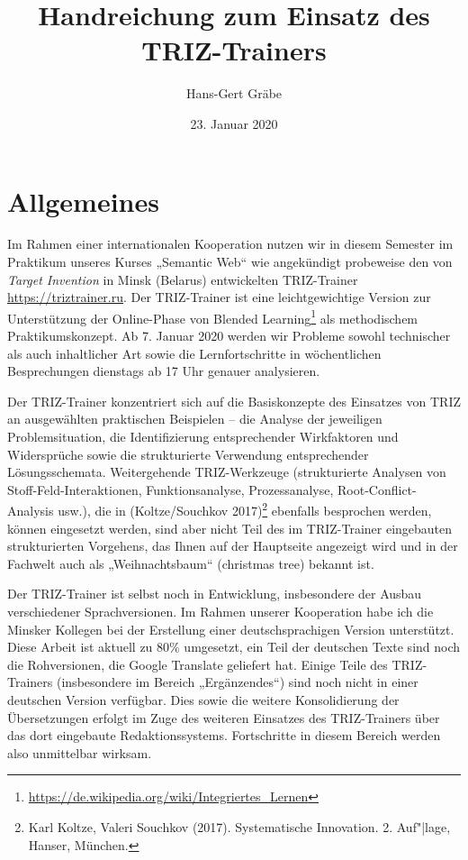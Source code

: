 \documentclass[11pt,a4paper]{article}
\title{Handreichung zum Einsatz des TRIZ-Trainers}
\author{Hans-Gert Gr\"abe}
\date{23. Januar 2020}
\begin{document}
\maketitle

\section{Allgemeines}

Im Rahmen einer internationalen Kooperation nutzen wir in diesem Semester im
Praktikum unseres Kurses „Semantic Web“ wie angekündigt probeweise den von
\emph{Target Invention} in Minsk (Belarus) entwickelten TRIZ-Trainer
\url{https://triztrainer.ru}.  Der TRIZ-Trainer ist eine leichtgewichtige
Version zur Unterstützung der Online-Phase von Blended
Learning\footnote{\url{https://de.wikipedia.org/wiki/Integriertes_Lernen}} als
methodischem Praktikumskonzept.  Ab 7. Januar 2020 werden wir Probleme sowohl
technischer als auch inhaltlicher Art sowie die Lernfortschritte in
wöchentlichen Besprechungen dienstags ab 17 Uhr genauer analysieren.

Der TRIZ-Trainer konzentriert sich auf die Basiskonzepte des Einsatzes von
TRIZ an ausgewählten praktischen Beispielen -- die Analyse der jeweiligen
Problemsituation, die Identifizierung entsprechender Wirkfaktoren und
Widersprüche sowie die strukturierte Verwendung entsprechender
Lösungsschemata.  Weitergehende TRIZ-Werkzeuge (strukturierte Analysen von
Stoff-Feld-Interaktionen, Funktionsanalyse, Prozessanalyse,
Root-Conflict-Analysis usw.), die in (Koltze/Souchkov 2017)\footnote{Karl
  Koltze, Valeri Souchkov (2017). Systematische Innovation.  2. Auf"|lage,
  Hanser, München.} ebenfalls besprochen werden, können eingesetzt werden,
sind aber nicht Teil des im TRIZ-Trainer eingebauten strukturierten Vorgehens,
das Ihnen auf der Hauptseite angezeigt wird und in der Fachwelt auch als
„Weihnachtsbaum“ (christmas tree) bekannt ist.

Der TRIZ-Trainer ist selbst noch in Entwicklung, insbesondere der Ausbau
verschiedener Sprachversionen.  Im Rahmen unserer Kooperation habe ich die
Minsker Kollegen bei der Erstellung einer deutschsprachigen Version
unterstützt.  Diese Arbeit ist aktuell zu 80\% umgesetzt, ein Teil der
deutschen Texte sind noch die Rohversionen, die Google Translate geliefert
hat.  Einige Teile des TRIZ-Trainers (insbesondere im Bereich „Ergänzendes“)
sind noch nicht in einer deutschen Version verfügbar. Dies sowie die weitere
Konsolidierung der Übersetzungen erfolgt im Zuge des weiteren Einsatzes des
TRIZ-Trainers über das dort eingebaute Redaktionssystems. Fortschritte in
diesem Bereich werden also unmittelbar wirksam.
\newpage
\end{document}
